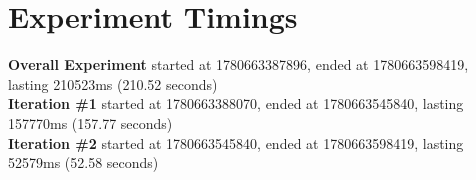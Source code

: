 \documentclass{article}
\begin{document}
\section*{Experiment Timings}
\textbf{Overall Experiment} started at 1780663387896, ended at 1780663598419, lasting 210523ms (210.52 seconds)
\\\textbf{Iteration \#1} started at 1780663388070, ended at 1780663545840, lasting 157770ms (157.77 seconds)
\\\textbf{Iteration \#2} started at 1780663545840, ended at 1780663598419, lasting 52579ms (52.58 seconds)
\end{document}
